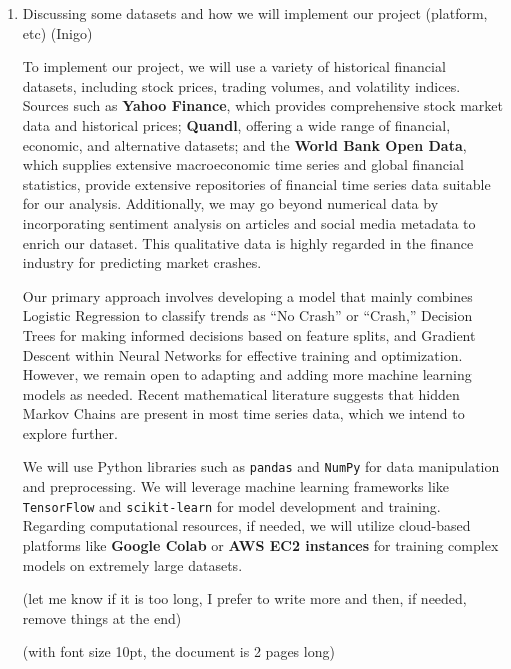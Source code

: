 \documentclass[12pt, letterpaper]{article}
\begin{document}
\begin{enumerate}
        
    \item Discussing some datasets and how we will implement our project (platform, etc) (Inigo)

    To implement our project, we will use a variety of historical financial datasets, including stock prices, trading volumes, and volatility indices. Sources such as \textbf{Yahoo Finance}, which provides comprehensive stock market data and historical prices; \textbf{Quandl}, offering a wide range of financial, economic, and alternative datasets; and the \textbf{World Bank Open Data}, which supplies extensive macroeconomic time series and global financial statistics, provide extensive repositories of financial time series data suitable for our analysis. Additionally, we may go beyond numerical data by incorporating sentiment analysis on articles and social media metadata to enrich our dataset. This qualitative data is highly regarded in the finance industry for predicting market crashes.

Our primary approach involves developing a model that mainly combines Logistic Regression to classify trends as ``No Crash'' or ``Crash,'' Decision Trees for making informed decisions based on feature splits, and Gradient Descent within Neural Networks for effective training and optimization. However, we remain open to adapting and adding more machine learning models as needed. Recent mathematical literature suggests that hidden Markov Chains are present in most time series data, which we intend to explore further.

We will use Python libraries such as \texttt{pandas} and \texttt{NumPy} for data manipulation and preprocessing. We will leverage machine learning frameworks like \texttt{TensorFlow} and \texttt{scikit-learn} for model development and training. Regarding computational resources, if needed, we will utilize cloud-based platforms like \textbf{Google Colab} or \textbf{AWS EC2 instances} for training complex models on extremely large datasets. 


(let me know if it is too long, I prefer to write more and then, if needed, remove things at the end)

(with font size 10pt, the document is 2 pages long)
    





    
\end{enumerate}
\end{document}
